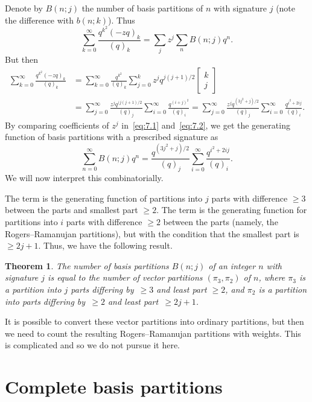 \documentclass[10pt,a4paper]{amsart}
\numberwithin{equation}{section}
\newtheorem{Theorem}{Theorem}[section]
\theoremstyle{definition}
\newcommand{\qbin}[2]{\left[\begin{matrix} #1 \\ #2 \end{matrix} \right]}
\begin{document}
Denote by $B(n;j)$ the number of basis partitions of $n$ with signature
$j$ (note the difference with $b(n;k)$). Thus
\begin{equation}
\sum^{\infty}_{k=0}\frac{q^{k^2}(-zq)_k}{(q)_k}=
\sum_j z^j\sum_nB(n;j)q^n.\label{eq:7.1}
\end{equation}
But then
\begin{align}
\sum^{\infty}_{k=0}\frac{q^{k^2}(-zq)_k}{(q)_k}& =
\sum^{\infty}_{k=0}\frac{q^{k^2}}{(q)_k}\sum^k_{j=0}z^jq^{j(j+1)/2}
\qbin{k}{j}
\nonumber\\
& =\sum^{\infty}_{j=0}\frac{z^jq^{(j(j+1)/2}}{(q)_j}
\sum^{\infty}_{i=0}\frac{q^{(i+j)^2}}{(q)_i}=
\sum^{\infty}_{j=0}\frac{z^jq^{(3j^2+j)/2}}{(q)_j}
\sum^{\infty}_{i=0}\frac{q^{i^2+2ij}}{(q)_i}.\label{eq:7.2}
\end{align}
By comparing coefficients of $z^j$ in~\eqref{eq:7.1} and~\eqref{eq:7.2}, we get the
generating function of basis partitions with a prescribed signature as
\begin{equation*}
\sum^{\infty}_{n=0}B(n;j)q^n=
\frac{q^{(3j^2+j)/2}}{(q)_j}
\sum^{\infty}_{i=0}\frac{q^{i^2+2ij}}{(q)_i}.%
\end{equation*}
We will now interpret this combinatorially.

The term
is the generating function of partitions into $j$ parts with difference
$\ge 3$ between the parts and smallest part $\ge 2$. The term
is the generating function for partitions into $i$ parts with difference
$\ge 2$ between the parts (namely, the Rogers--Ramanujan partitions), but
with the condition that the smallest part is~${\ge 2j+1}$. Thus, we have
the following result.

\begin{Theorem}%
The number of basis partitions $B(n;j)$ of an integer $n$ with signature $j$ is equal to the number of vector partitions
$(\pi_3,\pi_2)$ of $n$, where $\pi_3$ is a partition into $j$ parts
differing by~$\ge 3$ and least part $\ge 2$, and $\pi_2$
is a partition into parts differing by~$\ge 2$ and least part~${\ge 2j+1}$.
\end{Theorem}

It is possible to convert these vector partitions into ordinary partitions,
but then we need to count the resulting Rogers--Ramanujan partitions with
weights. This is complicated and so we do not pursue it here.

\section{Complete basis partitions}
\end{document}
